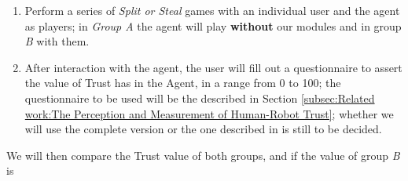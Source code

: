 \begin{enumerate}
	\item Perform a series of \textit{Split or Steal} games with an individual user and the agent as players; in \textit{Group A} the agent will play \textbf{without} our modules and in group \textit{B} with them.
	\item After interaction with the agent, the user will fill out a questionnaire to assert the value of Trust has in the Agent, in a range from 0 to 100; the questionnaire to be used will be the described in Section \ref{subsec:Related work:The Perception and Measurement of Human-Robot Trust}; whether we will use the complete version or the one described in %
	is still to be decided.
\end{enumerate}

We will then compare the Trust value of both groups, and if the value of group \textit{B} is 